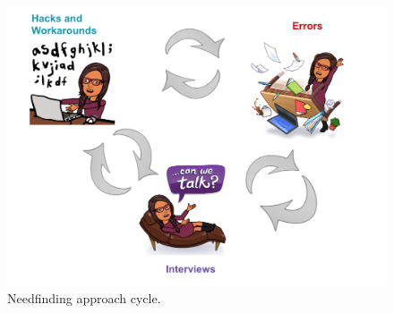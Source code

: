 \documentclass[12pt,letterpaper]{article}
\begin{document}
\begin{figure}[h]
\centering
\includegraphics[scale=.5]{approach_cycle.png}
\caption{Needfinding approach cycle.}
\label{fig::7}
\end{figure}

 

\end{document}
